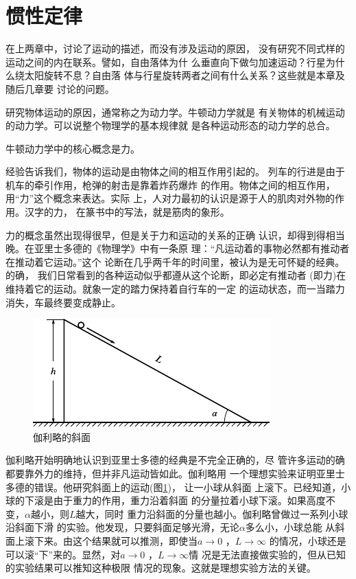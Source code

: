 \section{惯性定律}\label{sec:03.01}
\vspace{-0.5em}
在上两章中，讨论了运动的描述，而没有涉及运动的原因，
没有研究不同式样的运动之间的内在联系。譬如，自由落体为什
么垂直向下做匀加速运动？行星为什么绕太阳旋转不息？自由落
体与行星旋转两者之间有什么关系？这些就是本章及随后几章要
讨论的问题。

研究物体运动的原因，通常称之为动力学。牛顿动力学就是
有关物体的机械运动的动力学。可以说整个物理学的基本规律就
是各种运动形态的动力学的总合。

牛顿动力学中的核心概念是力。

经验告诉我们，物体的运动是由物体之间的相互作用引起的。
列车的行进是由于机车的牵引作用，枪弹的射击是靠着炸药爆炸
的作用。物体之间的相互作用，用“力”这个概念来表达。实际
上，人对力最初的认识是源于人的肌肉对外物的作用。汉字的力，
在篆书中的写法，就是筋肉的象形。

力的概念虽然出现得很早，但是关于力和运动的关系的正确
认识，却得到得相当晚。在亚里士多德的《物理学》中有一条原
理：“凡运动着的事物必然都有推动者在推动着它运动。”这个
论断在几乎两千年的时间里，被认为是无可怀疑的经典。的确，
我们日常看到的各种运动似乎都遵从这个论断，即必定有推动者
(即力)在维持着它的运动。就象一定的踏力保持着自行车的一定
的运动状态，而一当踏力消失，车最终要变成静止。

\begin{figure}
  \includegraphics{figure/fig03.01}
  \caption{伽利略的斜面}
  \label{fig:03.01}
\end{figure}
伽利略开始明确地认识到亚里士多德的经典是不完全正确的，尽
管许多运动的确都要靠外力的维持，但并非凡运动皆如此。伽利略用
一个理想实验来证明亚里士多德的错误。他研究斜面上的运动(图\ref{fig:03.01})，
让一小球从斜面
上滚下。已经知道，小球的下滚是由于重力的作用，重力沿着斜面
的分量拉着小球下滚。如果高度不变，$\alpha$越小，则$ L $越大，同时
重力沿斜面的分量也越小。伽利略曾做过一系列小球沿斜面下滑
的实验。他发现，只要斜面足够光滑，无论$\alpha$多么小，小球总能
从斜面上滚下来。由这个结果就可以推测，即使当$ a \rightarrow 0$  ，$L \rightarrow \infty$
的情况，小球还是可以滚“下”来的。显然，对$ a \rightarrow 0$  ，$L \rightarrow \infty$情
况是无法直接做实验的，但从已知的实验结果可以推知这种极限
情况的现象。这就是理想实验方法的关键。

